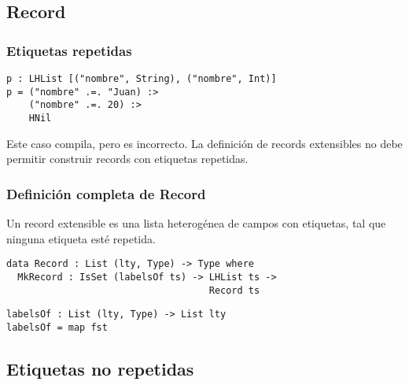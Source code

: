 \documentclass{beamer}
\begin{document}
\subsection{Record}

\begin{frame}[fragile]
\frametitle{Etiquetas repetidas}

\begin{example}
\begin{verbatim}
p : LHList [("nombre", String), ("nombre", Int)]
p = ("nombre" .=. "Juan) :> 
    ("nombre" .=. 20) :> 
    HNil
\end{verbatim}
\end{example}

\pause

Este caso compila, pero es incorrecto. La definición de records extensibles no debe permitir construir records con etiquetas repetidas.

\end{frame}

\begin{frame}[fragile]
\frametitle{Definición completa de Record}

Un record extensible es una lista heterogénea de campos con etiquetas, tal que ninguna etiqueta esté repetida.

\pause

\begin{definition}
\begin{verbatim}
data Record : List (lty, Type) -> Type where
  MkRecord : IsSet (labelsOf ts) -> LHList ts ->
                                    Record ts
\end{verbatim}
\end{definition}

\begin{definition}
\begin{verbatim}
labelsOf : List (lty, Type) -> List lty
labelsOf = map fst
\end{verbatim}
\end{definition}

\end{frame}

\subsection{Etiquetas no repetidas}
\end{document}
